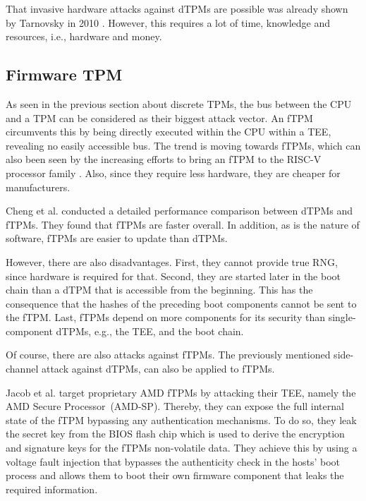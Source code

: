 That invasive hardware attacks against dTPMs are possible was already shown by Tarnovsky in 2010 \cite{tarnovsky}. However, this requires a lot of time, knowledge and resources, i.e., hardware and money.


\subsection{Firmware TPM}


As seen in the previous section about discrete TPMs, the bus between the CPU and a TPM can be considered as their biggest attack vector. An fTPM \cite{Raj2015, 197213} circumvents this by being directly executed within the CPU within a \ac{TEE}, revealing no easily accessible bus.
The trend is moving towards fTPMs, which can also been seen by the increasing efforts to bring an fTPM to the RISC-V processor family \cite{Boubakri2021}. Also, since they require less hardware, they are cheaper for manufacturers.

Cheng et al. \cite{Cheng2020} conducted a detailed performance comparison between dTPMs and fTPMs. They found that fTPMs are faster overall. %
In addition, as is the nature of software, fTPMs are easier to update than dTPMs.

However, there are also disadvantages. First, they cannot provide true RNG, since hardware is required for that. Second, they are started later in the boot chain than a dTPM that is accessible from the beginning. This has the consequence that the hashes of the preceding boot components cannot be sent to the fTPM. Last, fTPMs depend on more components for its security than single-component dTPMs, e.g., the \ac{TEE}, and the boot chain.

Of course, there are also attacks against fTPMs.
The previously mentioned side-channel attack \cite{Moghimi2019} against dTPMs, can also be applied to fTPMs.

Jacob et al. \cite{Jacob2023} target proprietary AMD fTPMs by attacking their \ac{TEE}, namely the AMD Secure Processor~(AMD-SP). Thereby, they can expose the full internal state of the fTPM bypassing any authentication mechanisms. To do so, they leak the secret key from the BIOS flash chip which is used to derive the encryption and signature keys for the fTPMs non-volatile data. They achieve this by using a voltage fault injection that bypasses the authenticity check in the hosts' boot process and allows them to boot their own firmware component that leaks the required information.

